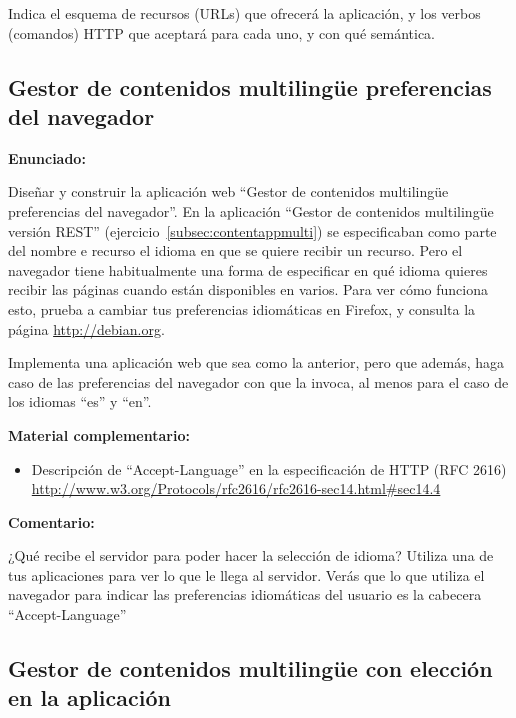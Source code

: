 Indica el esquema de recursos (URLs) que ofrecerá la aplicación, y los verbos (comandos) HTTP que aceptará para cada uno, y con qué semántica.

\subsection{Gestor de contenidos multilingüe preferencias del navegador}
\label{subsec:contentappmulti-navegador}

\textbf{Enunciado:}

Diseñar y construir la aplicación web ``Gestor de contenidos multilingüe preferencias del navegador''. En la aplicación ``Gestor de contenidos multilingüe versión REST'' (ejercicio~\ref{subsec:contentappmulti}) se especificaban como parte del nombre e recurso el idioma en que se quiere recibir un recurso. Pero el navegador tiene habitualmente una forma de especificar en qué idioma quieres recibir las páginas cuando están disponibles en varios. Para ver cómo funciona esto, prueba a cambiar tus preferencias idiomáticas en Firefox, y consulta la página \url{http://debian.org}.

Implementa una aplicación web que sea como la anterior, pero que además, haga caso de las preferencias del navegador con que la invoca, al menos para el caso de los idiomas ``es'' y ``en''.

\textbf{Material complementario:}
\begin{itemize}
\item Descripción de ``Accept-Language'' en la especificación de HTTP (RFC 2616) \\
  \url{http://www.w3.org/Protocols/rfc2616/rfc2616-sec14.html#sec14.4}
\end{itemize}

\textbf{Comentario:}

¿Qué recibe el servidor para poder hacer la selección de idioma? Utiliza una de tus aplicaciones para ver lo que le llega al servidor. Verás que lo que utiliza el navegador para indicar las preferencias idiomáticas del usuario es la cabecera ``Accept-Language''

\subsection{Gestor de contenidos multilingüe con elección en la aplicación}
\label{subsec:contentappmulti-apli}

